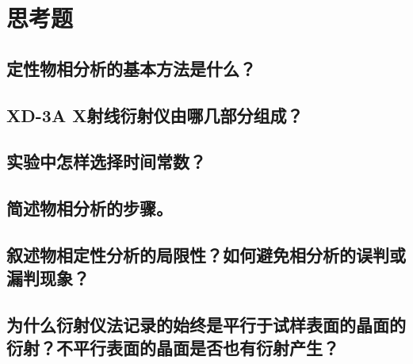 \documentclass[a4paper]{article}
\begin{document}
\section{思考题}
\subsection{定性物相分析的基本方法是什么？}
\subsection{XD-3A X射线衍射仪由哪几部分组成？}
\subsection{实验中怎样选择时间常数？}
\subsection{简述物相分析的步骤。}
\subsection{叙述物相定性分析的局限性？如何避免相分析的误判或漏判现象？}
\subsection{为什么衍射仪法记录的始终是平行于试样表面的晶面的衍射？不平行表面的晶面是否也有衍射产生？}

\nocite{jiaocai}

\end{document}
